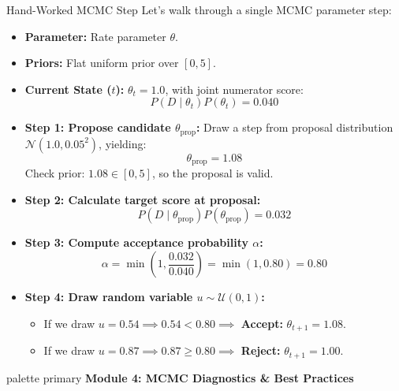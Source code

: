\documentclass[9pt]{beamer}
\begin{document}
\begin{frame}{Hand-Worked MCMC Step}
  Let's walk through a single MCMC parameter step:
  \begin{itemize}
    \item \textbf{Parameter:} Rate parameter $\theta$.
    \item \textbf{Priors:} Flat uniform prior over $[0, 5]$.
    \item \textbf{Current State ($t$):} $\theta_t = 1.0$, with joint numerator score:
      $$P(D \mid \theta_t) P(\theta_t) = 0.040$$
    \item \textbf{Step 1: Propose candidate $\theta_{\text{prop}}$:}
      Draw a step from proposal distribution $\mathcal{N}(1.0, 0.05^2)$, yielding:
      $$\theta_{\text{prop}} = 1.08$$
      Check prior: $1.08 \in [0, 5]$, so the proposal is valid.
    \item \textbf{Step 2: Calculate target score at proposal:}
      $$P(D \mid \theta_{\text{prop}}) P(\theta_{\text{prop}}) = 0.032$$
    \item \textbf{Step 3: Compute acceptance probability $\alpha$:}
      $$\alpha = \min\left(1, \frac{0.032}{0.040}\right) = \min(1, 0.80) = 0.80$$
    \item \textbf{Step 4: Draw random variable $u \sim \mathcal{U}(0, 1)$:}
      \begin{itemize}
        \item If we draw $u = 0.54 \implies 0.54 < 0.80 \implies$ \textbf{Accept:} $\theta_{t+1} = 1.08$.
        \item If we draw $u = 0.87 \implies 0.87 \ge 0.80 \implies$ \textbf{Reject:} $\theta_{t+1} = 1.00$.
      \end{itemize}
  \end{itemize}
\end{frame}

\begin{frame}[plain]
  \vfill
  \centering
  \begin{beamercolorbox}[sep=8pt,center,shadow=true,rounded=true]{palette primary}
    \textbf{Module 4: MCMC Diagnostics \& Best Practices}
  \end{beamercolorbox}
  \vfill
\end{frame}
\end{document}
